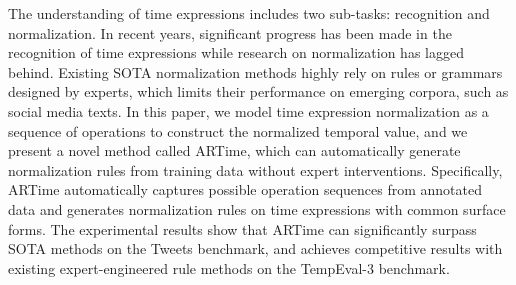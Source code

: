 The understanding of time expressions includes two sub-tasks: recognition and normalization. In recent years, significant progress has been made in the recognition of time expressions while research on normalization has lagged behind. Existing SOTA normalization methods highly rely on rules or grammars designed by experts, which limits their performance on emerging corpora, such as social media texts. In this paper, we model time expression normalization as a sequence of operations to construct the normalized temporal value, and we present a novel method called ARTime, which can automatically generate normalization rules from training data without expert interventions. Specifically, ARTime automatically captures possible operation sequences from annotated data and generates normalization rules on time expressions with common surface forms. The experimental results show that ARTime can significantly surpass SOTA methods on the Tweets benchmark, and achieves competitive results with existing expert-engineered rule methods on the TempEval-3 benchmark.
